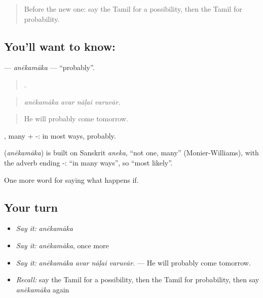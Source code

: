 \label{lesson:TA-C383-anekamaka}



\begin{quote}
Before the new one: say the Tamil for a possibility, then the Tamil for probability.
\end{quote}

\subsection*{You'll want to know: }
\textbf{} — \emph{anēkamāka} — \textquotedblleft{}probably\textquotedblright{}.

\begin{quote}
   .
\end{quote}

\begin{quote}
\emph{anēkamāka avar nāḷai varuvār.}
\end{quote}

\begin{quote}
He will probably come tomorrow.
\end{quote}

, many + -: in most ways, probably.

\begin{cousinweb}
\textbf{} (\emph{anēkamāka}) is built on Sanskrit \emph{aneka}, \textquotedblleft{}not one, many\textquotedblright{} (Monier-Williams), with the adverb ending -: \textquotedblleft{}in many ways\textquotedblright{}, so \textquotedblleft{}most likely\textquotedblright{}.
\end{cousinweb}

\begin{grammarlens}[title={What you've built}]
One more word for saying what happens if.
\end{grammarlens}

\subsection*{Your turn}
\begin{itemize}
\raggedright
  \item \emph{Say it:} \emph{anēkamāka}
  \item \emph{Say it:} \emph{anēkamāka}, once more
  \item \emph{Say it:} \emph{anēkamāka avar nāḷai varuvār.} — He will probably come tomorrow.
  \item \emph{Recall:} say the Tamil for a possibility, then the Tamil for probability, then say \emph{anēkamāka} again
\end{itemize}

